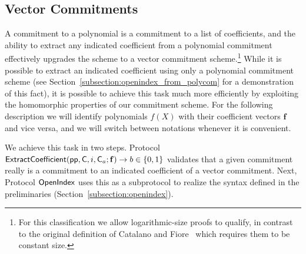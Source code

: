 \documentclass{article}
\theoremstyle{definition}
\begin{document}
\begin{comment}
\subsection{Fix coefficients and negative degrees}
\begin{itemize}
	\item Several ways to do this.
\end{itemize}

\subsection{Range Proofs}

Follows from security proof of Eval.
\end{comment}



\subsection{Vector Commitments}

A commitment to a polynomial is a commitment to a list of coefficients, and the ability to extract any indicated coefficient from a polynomial commitment effectively upgrades the scheme to a vector commitment scheme.\footnote{For this classification we allow logarithmic-size proofs to qualify, in contrast to the original definition of Catalano and Fiore~\cite{PKC:CatFio13} which requires them to be constant size.} While it is possible to extract an indicated coefficient using only a polynomial commitment scheme (see Section~\ref{subsection:openindex_from_polycom} for a demonstration of this fact), it is possible to achieve this task much more efficiently by exploiting the homomorphic properties of our commitment scheme. For the following description we will identify polynomials $f(X)$ with their coefficient vectors $\mathbf{f}$ and vice versa, and we will switch between notations whenever it is convenient.

We achieve this task in two steps. Protocol $\textsf{{ExtractCoefficient}}(\textsf{pp}, \mathsf{C}, i, \mathsf{C}_a; \mathbf{f}) \rightarrow b \in \{0,1\}$ validates that a given commitment really is a commitment to an indicated coefficient of a vector commitment. Next, Protocol $\textsf{{OpenIndex}}$ uses this as a subprotocol to realize the syntax defined in the preliminaries (Section~\ref{subsection:openindex}). 
\end{document}
